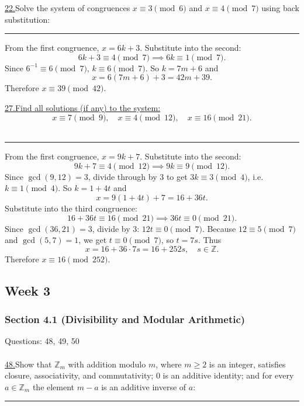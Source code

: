 \documentclass[12pt]{article}
\begin{document}
\newpage
\noindent\underline{22.}Solve the system of congruences $x \equiv 3 \pmod{6}$ and $x \equiv 4 \pmod{7}$ using back substitution:
\\ \rule{\linewidth}{0.5pt}
From the first congruence, $x=6k+3$. Substitute into the second:
\[
6k+3 \equiv 4 \pmod{7} \implies 6k \equiv 1 \pmod{7}.
\]
Since $6^{-1}\equiv6\pmod7$, $k\equiv6\pmod7$. So $k=7m+6$ and
\[
x = 6(7m+6)+3 = 42m + 39.
\]
Therefore $x \equiv 39 \pmod{42}$.

\vspace{5mm}

\newpage
\noindent\underline{27.\;Find all solutions (if any) to the system:}
\[
 x \equiv 7 \pmod{9},\quad
 x \equiv 4 \pmod{12},\quad
 x \equiv 16 \pmod{21}.
\]
\\ \rule{\linewidth}{0.5pt}
From the first congruence, $x = 9k + 7$. Substitute into the second:
\[
9k + 7 \equiv 4 \pmod{12} \implies 9k \equiv 9 \pmod{12}.
\]
Since $\gcd(9,12)=3$, divide through by 3 to get $3k \equiv 3 \pmod{4}$, i.e. $k \equiv 1 \pmod{4}$. So $k=1+4t$ and
\[
x = 9(1+4t)+7 = 16 + 36t.
\]
Substitute into the third congruence:
\[
16 + 36t \equiv 16 \pmod{21} \implies 36t \equiv 0 \pmod{21}.
\]
Since $\gcd(36,21)=3$, divide by 3: $12t \equiv 0 \pmod{7}$. Because $12\equiv5\pmod7$ and $\gcd(5,7)=1$, we get $t\equiv 0 \pmod{7}$, so $t=7s$.
Thus
\[
x = 16 + 36\cdot 7s = 16 + 252s,\quad s\in\mathbb{Z}.
\]
Therefore $x \equiv 16 \pmod{252}$.

\newpage

\subsection*{Week 3}
\subsubsection*{Section 4.1 (Divisibility and Modular Arithmetic)}
Questions: 48, 49, 50
\\\\


\noindent\underline{48.}Show that $\mathbb{Z}_m$ with addition modulo $m$, where $m \geq 2$ is an integer, satisfies closure, associativity, and commutativity; $0$ is an additive identity; and for every $a\in\mathbb{Z}_m$ the element $m-a$ is an additive inverse of $a$:
\\\rule{\linewidth}{0.5pt}
\end{document}

